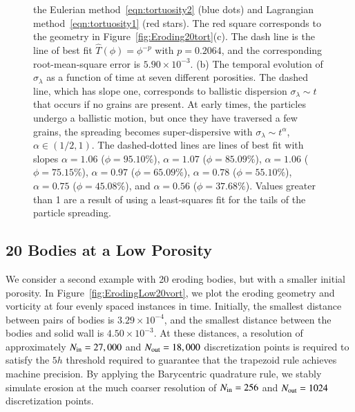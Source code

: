 \documentclass[preprint,10pt]{elsarticle}
\begin{document}
\begin{figure}[H]
{the Eulerian method~\eqref{eqn:tortuosity2} (blue dots) and Lagrangian
method~\eqref{eqn:tortuosity1} (red stars).  The red square corresponds
to the geometry in Figure~\ref{fig:Eroding20tort}(c).  The dash line is
the line of best fit $\widehat{T}(\phi)=\phi^{-p}$ with $p=0.2064$, and
the corresponding root-mean-square error is $5.90 \times 10^{-3}$. (b)
The temporal evolution of $\sigma_\lambda$ as a function of time at
seven different porosities.  The dashed line, which has slope one,
corresponds to ballistic dispersion $\sigma_\lambda \sim t$ that occurs
if no grains are present. At early times, the particles undergo a
ballistic motion, but once they have traversed a few grains, the
spreading becomes super-dispersive with $\sigma_\lambda \sim t^\alpha$,
$\alpha \in (1/2,1)$.  The dashed-dotted lines are lines of best fit
with slopes $\alpha = 1.06$ ($\phi=95.10\%$), $\alpha = 1.07$
($\phi=85.09\%$), $\alpha = 1.06$ ($\phi=75.15\%$), $\alpha = 0.97$
($\phi=65.09\%$), $\alpha = 0.78$ ($\phi=55.10\%$), $\alpha = 0.75$
($\phi=45.08\%$), and $\alpha = 0.56$ ($\phi=37.68\%$).  Values greater
than 1 are a result of using a least-squares fit for the tails of the
particle spreading.}
\end{figure}



\subsection{20 Bodies at a Low Porosity}
We consider a second example with 20 eroding bodies, but with a smaller
initial porosity.  In Figure~\ref{fig:ErodingLow20vort}, we plot the
eroding geometry and vorticity at four evenly spaced instances in time.
Initially, the smallest distance between pairs of bodies is $3.29 \times
10^{-4}$, and the smallest distance between the bodies and solid wall is
$4.50 \times 10^{-3}$.  At these distances, a resolution of
approximately $N_{\mathrm{in}} = 27,000$ and $N_{\mathrm{out}} = 18,000$ discretization
points is required to satisfy the $5h$ threshold required to guarantee
that the trapezoid rule achieves machine precision.  By applying the
Barycentric quadrature rule, we stably simulate erosion at the much
coarser resolution of $N_{\mathrm{in}} = 256$ and $N_{\mathrm{out}} = 1024$ discretization
points.
\end{document}
